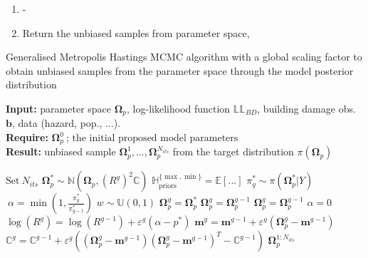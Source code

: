 \documentclass[10pt,a4paper]{article}
\begin{document}
\begin{multicols}{1}
\begin{enumerate}
\item -
\item Return the unbiased samples from parameter space,
\end{enumerate}
\begin{algorithm}[H]
\caption{\label{alg:GSFMH} Generalised Metropolis Hastings MCMC algorithm with a global scaling factor to obtain unbiased samples from the parameter space through the model posterior distribution}
    \hspace*{\algorithmicindent} \textbf{Input:} parameter space $\boldsymbol{\Omega}_p$, log-likelihood function $\mathbb{LL}_{BD}$, building damage obs. $\boldsymbol{b}$, data (hazard, pop., ...).  \\
    \hspace*{\algorithmicindent} \textbf{Require:} $\boldsymbol{\Omega}_p^0 \ \text{; the initial proposed model parameters}$ \\
    \hspace*{\algorithmicindent} \textbf{Result:} unbiased sample $\boldsymbol{\Omega}^1_p,...,\boldsymbol{\Omega}^{N_{its}}_p$ from the target distribution $\pi(\boldsymbol{\Omega}_p)$
\begin{algorithmic}[1]
\begin{spacing}{1.5} 
\STATE $\text{Set} \ N_{its} $
\STATE $\boldsymbol{\Omega}_p^{*}\sim\mathbb{N}(\boldsymbol{\Omega}_p,(R^g)^2\boldsymbol{\mathbb{C}}) $
\STATE $\mathbb{H}_{\text{priors}}^{\{\max,\min\}}=\mathbb{E}[...]$
    \STATE $\pi^*_g\sim\pi(\boldsymbol{\Omega}_p^{*}|Y)$
    \STATE $\ \alpha = \min\left(1,\frac{\pi^*_g}{\pi^*_{g-1}}\right)$
    \STATE $w\sim \mathbb{U}(0,1)$
    \STATE $\boldsymbol{\Omega}_p^{g} = \boldsymbol{\Omega}_p^{*}$
    \ELSE
    \STATE $\boldsymbol{\Omega}_p^{g} = \boldsymbol{\Omega}_p^{g-1} $
    \ENDIF
    \ELSE
    \STATE $\boldsymbol{\Omega}_p^{g} = \boldsymbol{\Omega}_p^{g-1} $
    \STATE $\alpha=0$
    \ENDIF
    \STATE $\log(R^g)=\log(R^{g-1})+\varepsilon^g(\alpha-p^*)$
    \STATE $\boldsymbol{m}^g=\boldsymbol{m}^{g-1}+\varepsilon^g(\boldsymbol{\Omega}_p^g-\boldsymbol{m}^{g-1})$
    \STATE $\boldsymbol{\mathbb{C}}^g=\boldsymbol{\mathbb{C}}^{g-1}+\varepsilon^g\left((\boldsymbol{\Omega}_p^g-\boldsymbol{m}^{g-1})(\boldsymbol{\Omega}_p^g-\boldsymbol{m}^{g-1})^T-\boldsymbol{\mathbb{C}}^{g-1}\right)$    
\ENDFOR
\RETURN $\boldsymbol{\Omega}_p^{1:N_{its}}$
\end{spacing}
\end{algorithmic}
\end{algorithm}


\end{multicols}
\end{document}
